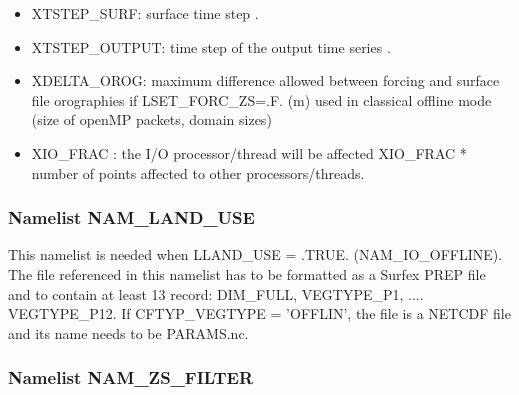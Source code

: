 \begin{itemize}
	\item XTSTEP\_SURF: surface time step .
	\item XTSTEP\_OUTPUT: time step of the output time series .
	\item XDELTA\_OROG: maximum difference allowed between forcing and surface file orographies if LSET\_FORC\_ZS=.F. (m) used in classical offline mode (size of openMP packets, domain sizes)
	\item XIO\_FRAC : the I/O processor/thread will be affected XIO\_FRAC * number of points affected to other processors/threads.
\end{itemize}

\subsubsection{Namelist NAM\_LAND\_USE}
This namelist is needed when LLAND\_USE = .TRUE. (NAM\_IO\_OFFLINE). The file referenced in this namelist has to be formatted as a Surfex PREP file and to contain at least 13 record: DIM\_FULL, VEGTYPE\_P1, .... VEGTYPE\_P12. If CFTYP\_VEGTYPE = 'OFFLIN', the file is a NETCDF file and its name needs to be PARAMS.nc.


\subsubsection{Namelist NAM\_ZS\_FILTER}


